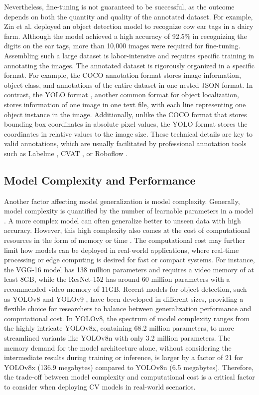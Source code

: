 Nevertheless, fine-tuning is not guaranteed to be successful, as the outcome depends on both the quantity and quality of the annotated dataset. For example, Zin et al. \cite{zin_automatic_2020} deployed an object detection model to recognize cow ear tags in a dairy farm. Although the model achieved a high accuracy of 92.5\% in recognizing the digits on the ear tags, more than 10,000 images were required for fine-tuning. Assembling such a large dataset is labor-intensive and requires specific training in annotating the images. The annotated dataset is rigorously organized in a specific format. For example, the COCO annotation format \cite{lin2014microsoft} stores image information, object class, and annotations of the entire dataset in one nested JSON format. In contrast, the YOLO format \cite{ultralytics2023datasets}, another common format for object localization, stores information of one image in one text file, with each line representing one object instance in the image. Additionally, unlike the COCO format that stores bounding box coordinates in absolute pixel values, the YOLO format stores the coordinates in relative values to the image size. These technical details are key to valid annotations, which are usually facilitated by professional annotation tools such as Labelme \cite{labelme2023}, CVAT \cite{cvat2023}, or Roboflow \cite{roboflow2023}.

\subsection{Model Complexity and Performance}
Another factor affecting model generalization is model complexity. Generally, model complexity is quantified by the number of learnable parameters in a model \cite{hu2021model}. A more complex model can often generalize better to unseen data with high accuracy. However, this high complexity also comes at the cost of computational resources in the form of memory or time \cite{justus2018predicting}. The computational cost may further limit how models can be deployed in real-world applications, where real-time processing or edge computing is desired for fast or compact systems. For instance, the VGG-16 model \cite{simonyan2014very} has 138 million parameters and requires a video memory of at least 8GB, while the ResNet-152 \cite{he2016deep} has around 60 million parameters with a recommended video memory of 11GB. Recent models for object detection, such as YOLOv8 \cite{ultralyticsYOLOv8} and YOLOv9 \cite{wang2024yolov9}, have been developed in different sizes, providing a flexible choice for researchers to balance between generalization performance and computational cost. In YOLOv8, the spectrum of model complexity ranges from the highly intricate YOLOv8x, containing 68.2 million parameters, to more streamlined variants like YOLOv8n with only 3.2 million parameters. The memory demand for the model architecture alone, without considering the intermediate results during training or inference, is larger by a factor of 21 for YOLOv8x (136.9 megabytes) compared to YOLOv8n (6.5 megabytes). Therefore, the trade-off between model complexity and computational cost is a critical factor to consider when deploying CV models in real-world scenarios.

